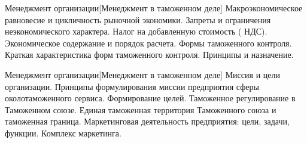 \documentclass[
	11pt,
	a4paper,
	]
	{article}
\begin{document}
\vfill



\begin{minipage}[t][\miniH]{\miniL}\centering
	 {Менеджмент организации}[Менеджмент в таможенном деле]
		{
			Макроэкономическое равновесие и цикличность рыночной экономики. Запреты и ограничения неэкономического характера.
		}{
			Налог на добавленную стоимость ( НДС). Экономическое содержание и порядок расчета.
		}{
			Формы таможенного контроля. Краткая характеристика форм таможенного контроля. Принципы и назначение.
		}
	\lowGE
\end{minipage}





\begin{minipage}[t][\miniH]{\miniL}\centering
	 {Менеджмент организации}[Менеджмент в таможенном деле]
		{
			Миссия и цели организации. Принципы формулирования миссии предприятия сферы околотаможенного сервиса. Формирование целей.
		}{
			Таможенное регулирование в Таможенном союзе. Единая таможенная территория Таможенного союза и таможенная граница.
		}{
			Маркетинговая деятельность предприятия: цели, задачи, функции. Комплекс маркетинга.
		}
	\lowGE
\end{minipage}

\vfill

	
\end{document}

